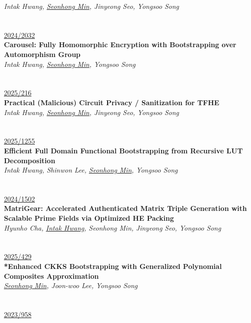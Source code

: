 \documentclass[a4paper, 10pt, twocolumn]{article}
\begin{document}
\textit{Intak Hwang, \underline{Seonhong Min}, Jinyeong Seo, Yongsoo Song} \\
 \\
\\
 {\small \href{https://eprint.iacr.org/2024/2032}{2024/2032}}\\
\textbf{Carousel: Fully Homomorphic Encryption with Bootstrapping over Automorphism Group} \\
\textit{Intak Hwang, \underline{Seonhong Min}, Yongsoo Song} \\
 \\
\\
 {\small \href{https://eprint.iacr.org/2025/216}{2025/216}}\\
\textbf{Practical (Malicious) Circuit Privacy / Sanitization for TFHE} \\
\textit{Intak Hwang, \underline{Seonhong Min}, Jinyeong Seo, Yongsoo Song} \\
 \\
\\
 {\small \href{https://eprint.iacr.org/2025/1255}{2025/1255}}\\
\textbf{Efficient Full Domain Functional Bootstrapping from Recursive LUT Decomposition} \\
\textit{Intak Hwang, Shinwon Lee, \underline{Seonhong Min}, Yongsoo Song} \\
 \\
\\
 {\small \href{https://eprint.iacr.org/2024/1502}{2024/1502}}\\
\textbf{MatriGear: Accelerated Authenticated Matrix Triple Generation with Scalable Prime Fields via Optimized HE Packing} \\
\textit{Hyunho Cha, \underline{Intak Hwang}, Seonhong Min, Jinyeong Seo, Yongsoo Song} \\
 \\
\\
 {\small \href{https://eprint.iacr.org/2025/429}{2025/429}}\\
\textbf{*Enhanced CKKS Bootstrapping with Generalized Polynomial Composites Approximation} \\
\textit{\underline{Seonhong Min}, Joon-woo Lee, Yongsoo Song} \\
 \\
\\
 {\small \href{https://eprint.iacr.org/2023/958}{2023/958}}\\
\end{document}
